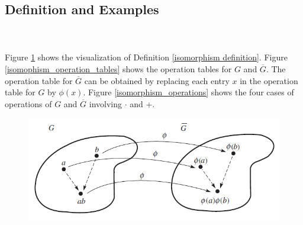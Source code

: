 \documentclass{article}
\theoremstyle{definition}
\newtheorem{definition}{Definition}[section]
\begin{document}
 \subsection{Definition and Examples}
 \\ \\
 Figure \ref{isomorphism} shows the visualization of Definition \ref{isomorphism definition}. Figure \ref{isomophism_operation_tables} shows the operation tables for $G$ and $\overline{G}$. The operation table for $\overline{G}$ can be obtained by replacing each entry $x$ in the operation table for $G$ by $\phi(x)$. Figure \ref{isomorphism_operations} shows the four cases of operations of $G$ and $\overline{G}$ involving $\cdot$ and +.
 
 \begin{figure}[!htbp]
     \centering
     \includegraphics[width=0.8\linewidth]{figures/isomorphism.png}
     \caption{}
     \label{isomorphism}
 \end{figure}
 
\end{document}
